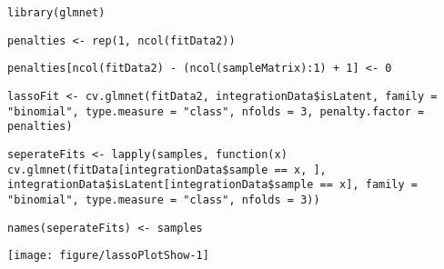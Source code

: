 \documentclass[../../sherrill-Mix_thesis.tex]{subfiles}
\makeatletter
\def\maxwidth{ %
  \ifdim\Gin@nat@width>\linewidth
    \linewidth
  \else
    \Gin@nat@width
  \fi
}
\newenvironment{kframe}{%
 \def\at@end@of@kframe{}%
 \ifinner\ifhmode%
  \def\at@end@of@kframe{\end{minipage}}%
  \begin{minipage}{\columnwidth}%
 \fi\fi%
 \def\FrameCommand##1{\hskip\@totalleftmargin \hskip-\fboxsep
 \colorbox{shadecolor}{##1}\hskip-\fboxsep
     \hskip-\linewidth \hskip-\@totalleftmargin \hskip\columnwidth}%
 \MakeFramed {\advance\hsize-\width
   \@totalleftmargin\z@ \linewidth\hsize
   \@setminipage}}%
 {\par\unskip\endMakeFramed%
 \at@end@of@kframe}
\newenvironment{knitrout}{}{} %
\makeatother
\begin{document}
\begin{center}
\begin{knitrout}
\color{fgcolor}\begin{kframe}
\begin{lstlisting}[basicstyle=\ttfamily,breaklines=true]
library(glmnet)\end{lstlisting}
\begin{lstlisting}[basicstyle=\ttfamily,breaklines=true]
penalties <- rep(1, ncol(fitData2))\end{lstlisting}
\begin{lstlisting}[basicstyle=\ttfamily,breaklines=true]
penalties[ncol(fitData2) - (ncol(sampleMatrix):1) + 1] <- 0\end{lstlisting}
\begin{lstlisting}[basicstyle=\ttfamily,breaklines=true]
lassoFit <- cv.glmnet(fitData2, integrationData$isLatent, family = "binomial", type.measure = "class", nfolds = 3, penalty.factor = penalties)\end{lstlisting}
\begin{lstlisting}[basicstyle=\ttfamily,breaklines=true]
seperateFits <- lapply(samples, function(x) cv.glmnet(fitData[integrationData$sample == x, ], integrationData$isLatent[integrationData$sample == x], family = "binomial", type.measure = "class", nfolds = 3))\end{lstlisting}
\begin{lstlisting}[basicstyle=\ttfamily,breaklines=true]
names(seperateFits) <- samples\end{lstlisting}
\end{kframe}
\end{knitrout}

\begin{knitrout}
\color{fgcolor}
\texttt{[image: figure/lassoPlotShow-1]} 

\end{knitrout}


\end{center}
\end{document}
